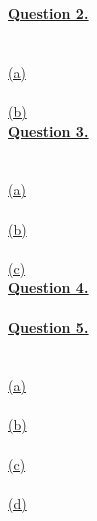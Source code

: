 \documentclass[12pt]{article}
\begin{document}
\newpage
\hyperlink{toc}{\LARGE \underline{\textbf{Question 2.}}}\\\\
~\\\hyperlink{toc}{\hypertarget{2.1}{(a)}}\\
~\\\hyperlink{toc}{\hypertarget{2.2}{(b)}}\\
\newpage
\hyperlink{toc}{{\LARGE \underline{\textbf{Question 3.}}}}\\\\
~\\\hyperlink{toc}{\hypertarget{3.1}{(a)}}\\
~\\\hyperlink{toc}{\hypertarget{3.2}{(b)}}\\
~\\\hyperlink{toc}{\hypertarget{3.3}{(c)}}\\
\newpage
\hyperlink{toc}{\hypertarget{4}{\LARGE \underline{\textbf{Question 4.}}}}\\\\
\newpage
\hyperlink{toc}{{\LARGE \underline{\textbf{Question 5.}}}}\\\\
~\\\hyperlink{toc}{\hypertarget{5.1}{(a)}}\\
~\\\hyperlink{toc}{\hypertarget{5.2}{(b)}}\\
~\\\hyperlink{toc}{\hypertarget{5.3}{(c)}}\\
~\\\hyperlink{toc}{\hypertarget{5.4}{(d)}}\\
\newpage
\end{document}
